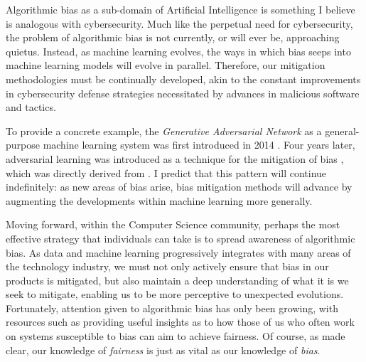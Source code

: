 \documentclass[a4paper]{IEEEtran}
\begin{document}
Algorithmic bias as a sub-domain of Artificial Intelligence is something I believe is analogous with cybersecurity. Much like the perpetual need for cybersecurity, the problem of algorithmic bias is not currently, or will ever be, approaching quietus. Instead, as machine learning evolves, the ways in which bias seeps into machine learning models will evolve in parallel. Therefore, our mitigation methodologies must be continually developed, akin to the constant improvements in cybersecurity defense strategies necessitated by advances in malicious software and tactics. 

To provide a concrete example, the \textit{Generative Adversarial Network} as a general-purpose machine learning system was first introduced in 2014 \cite{gan}. Four years later, adversarial learning was introduced as a technique for the mitigation of bias \cite{adv}, which was directly derived from \cite{gan}. I predict that this pattern will continue indefinitely: as new areas of bias arise, bias mitigation methods will advance by augmenting the developments within machine learning more generally.

Moving forward, within the Computer Science community, perhaps the most effective strategy that individuals can take is to spread awareness of algorithmic bias. As data and machine learning progressively integrates with many areas of the technology industry, we must not only actively ensure that bias in our products is mitigated, but also maintain a deep understanding of what it is we seek to mitigate, enabling us to be more perceptive to unexpected evolutions. Fortunately, attention given to algorithmic bias has only been growing, with resources such as \cite{b6} providing useful insights as to how those of us who often work on systems susceptible to bias can aim to achieve fairness. Of course, as \cite{b1} made clear, our knowledge of \textit{fairness} is just as vital as our knowledge of \textit{bias}.


\end{document}
